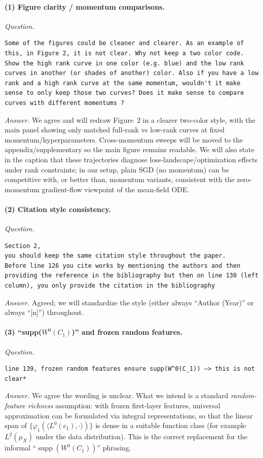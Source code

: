 \documentclass[11pt,a4paper]{article}
\begin{document}
\paragraph{(1) Figure clarity / momentum comparisons.}
\textit{Question.}\par
\begin{verbatim}
Some of the figures could be cleaner and clearer. As an example of this, in Figure 2, it is not clear. Why not keep a two color code. Show the high rank curve in one color (e.g. blue) and the low rank curves in another (or shades of another) color. Also if you have a low rank and a high rank curve at the same momentum, wouldn't it make sense to only keep those two curves? Does it make sense to compare curves with different momentums ?
\end{verbatim}
\textit{Answer.} We agree and will redraw Figure~2 in a clearer two-color style, with the main panel showing only matched full-rank vs low-rank curves at fixed momentum/hyperparameters. Cross-momentum sweeps will be moved to the appendix/supplementary so the main figure remains readable. We will also state in the caption that these trajectories diagnose loss-landscape/optimization effects under rank constraints; in our setup, plain SGD (no momentum) can be competitive with, or better than, momentum variants, consistent with the zero-momentum gradient-flow viewpoint of the mean-field ODE.

\paragraph{(2) Citation style consistency.}
\textit{Question.}\par
\begin{verbatim}
Section 2,
you should keep the same citation style throughout the paper.
Before line 126 you cite works by mentioning the authors and then providing the reference in the bibliography but then on line 130 (left column), you only provide the citation in the bibliography
\end{verbatim}
\textit{Answer.} Agreed; we will standardize the style (either always ``Author (Year)'' or always ``[n]'') throughout.

\paragraph{(3) ``supp($W^0(C_1)$)'' and frozen random features.}
\textit{Question.}\par
\begin{verbatim}
line 139, frozen random features ensure supp(W^0(C_1)) —> this is not clear*
\end{verbatim}
\textit{Answer.} We agree the wording is unclear. What we intend is a standard \emph{random-feature richness} assumption: with frozen first-layer features, universal approximation can be formulated via integral representations, so that the linear span of $\{\varphi_1(\langle L^0(c_1),\cdot\rangle)\}$ is dense in a suitable function class (for example $L^2(\mu_X)$ under the data distribution). This is the correct replacement for the informal ``$\operatorname{supp}(W^0(C_1))$'' phrasing.
\end{document}
